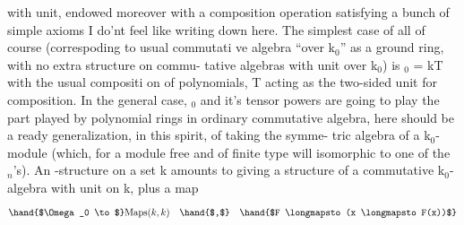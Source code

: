  with unit, endowed moreover with a composition operation 
satisfying a bunch of simple axioms I do'nt feel like writing down here.
The simplest case of all of course (correspoding to  usual commutati%
ve algebra ``over k$_0$'' as a ground ring, with no extra structure on commu-%
tative algebras with unit over k$_0$) is \hand{$\Omega$}$_0$ = k\hand{[}T\hand{]}\hand{,} with the usual compositi%
on of polynomials, T acting as the two-sided unit for composition. In
the general case, \hand{$\Omega$}$_0$ and it's tensor powers  are going to play the part
played by polynomial rings in ordinary commutative algebra,  here
should be a ready generalization, in this spirit, of taking the symme-%
tric algebra of a k$_0$-module (which, for a module free and of finite type\hand{\unsure{,}}
will  isomorphic to one of the \hand{$\Omega$}$_n$'s). An \hand{$\Omega$}-structure on a set  k
amounts to giving a structure of a commutative k$_0$-algebra with unit on k,
plus a map
\[ \hand{$\Omega_0 \to$} \mathrm{Maps}(k,k) \quad \hand{$,$} \quad \hand{$F \longmapsto (x \longmapsto F(x))$} \]

